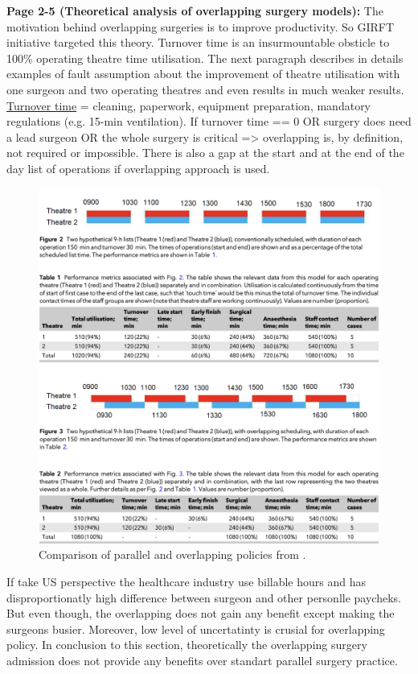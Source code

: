     \textbf{Page 2-5 (Theoretical analysis of overlapping surgery models):}
    The motivation behind overlapping surgeries is to improve productivity. So GIRFT initiative targeted this theory. Turnover time is an insurmountable obsticle to 100\% operating theatre time utilisation. The next paragraph describes in details examples of fault assumption about the improvement of theatre utilisation with one surgeon and two operating theatres and even results in much weaker results.
    \underline{Turnover time} = cleaning, paperwork, equipment preparation, mandatory regulations (e.g. 15-min ventilation). If turnover time == 0 OR surgery does need a lead surgeon OR the whole surgery is critical => overlapping is, by definition, not required or impossible. There is also a gap at the start and at the end of the day list of operations if overlapping approach is used.
    \begin{figure}[H]
        \centering
        \includegraphics[width=1\textwidth]{figures/0019_SR03GB22/fig1.png}
        \caption{Comparison of parallel and overlapping policies from \cite{x333}.}
        \label{fig1:0019_SR03GB22}
    \end{figure}
    If take US perspective the healthcare industry use billable hours and has disproportionatly high difference between surgeon and other personlle paycheks. But even though, the overlapping does not gain any benefit except making the surgeons busier. Moreover, low level of uncertatinty is crusial for overlapping policy. In conclusion to this section, theoretically the overlapping surgery admission does not provide any benefits over standart parallel surgery practice.

